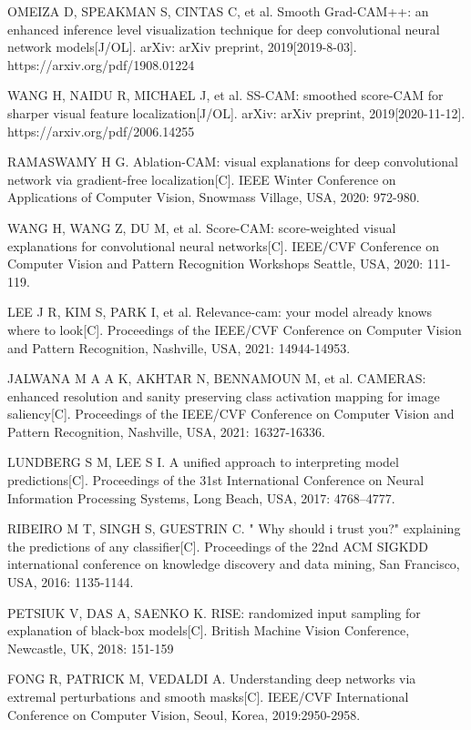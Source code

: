 \begin{thebibliography}{200}
OMEIZA D, SPEAKMAN S, CINTAS C, et al. Smooth Grad-CAM++: an enhanced inference level visualization technique for deep convolutional neural network models[J/OL]. arXiv: arXiv preprint, 2019[2019-8-03]. https://arxiv.org/pdf/1908.01224

WANG H, NAIDU R, MICHAEL J, et al. SS-CAM: smoothed score-CAM for sharper visual feature localization[J/OL]. arXiv: arXiv preprint, 2019[2020-11-12]. https://arxiv.org/pdf/2006.14255

RAMASWAMY H G. Ablation-CAM: visual explanations for deep convolutional network via gradient-free localization[C]. IEEE Winter Conference on Applications of Computer Vision, Snowmass Village, USA, 2020: 972-980.

WANG H, WANG Z, DU M, et al. Score-CAM: score-weighted visual explanations for convolutional neural networks[C]. IEEE/CVF Conference on Computer Vision and Pattern Recognition Workshops Seattle, USA, 2020: 111-119.

LEE J R, KIM S, PARK I, et al. Relevance-cam: your model already knows where to look[C]. Proceedings of the IEEE/CVF Conference on Computer Vision and Pattern Recognition, Nashville, USA, 2021: 14944-14953.

JALWANA M A A K, AKHTAR N, BENNAMOUN M, et al. CAMERAS: enhanced resolution and sanity preserving class activation mapping for image saliency[C]. Proceedings of the IEEE/CVF Conference on Computer Vision and Pattern Recognition, Nashville, USA, 2021: 16327-16336.

LUNDBERG S M, LEE S I. A unified approach to interpreting model predictions[C]. Proceedings of the 31st International Conference on Neural Information Processing Systems, Long Beach, USA, 2017: 4768–4777.

RIBEIRO M T, SINGH S, GUESTRIN C. " Why should i trust you?" explaining the predictions of any classifier[C]. Proceedings of the 22nd ACM SIGKDD international conference on knowledge discovery and data mining, San Francisco, USA, 2016: 1135-1144.

PETSIUK V, DAS A, SAENKO K. RISE: randomized input sampling for explanation of black-box models[C]. British Machine Vision Conference, Newcastle, UK, 2018: 151-159

FONG R, PATRICK M, VEDALDI A. Understanding deep networks via extremal perturbations and smooth masks[C]. IEEE/CVF International Conference on Computer Vision, Seoul, Korea, 2019:2950-2958.


\end{thebibliography}

